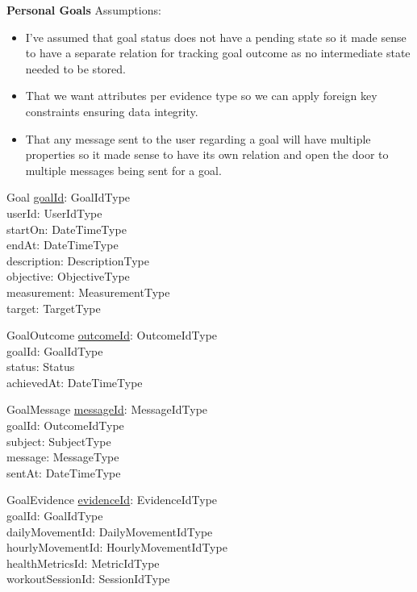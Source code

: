 \documentclass{article}
\begin{document}
\newline
\textbf{Personal Goals}
\newline \newline Assumptions:
\begin{itemize}
  \item I've assumed that goal status does not have a pending state so it made sense to have a separate relation for tracking goal outcome as no intermediate state needed to be stored. 
  \item That we want attributes per evidence type so we can apply foreign key constraints ensuring data integrity.
  \item That any message sent to the user regarding a goal will have multiple properties so it made sense to have its own relation and open the door to multiple messages being sent for a goal.
\end{itemize}
\begin{schema}{Goal}
	\underline{goalId}: GoalIdType \\
  userId: UserIdType \\
  startOn: DateTimeType \\
  endAt: DateTimeType \\ 
  description: DescriptionType \\
  objective: ObjectiveType \\
  measurement: MeasurementType \\
  target: TargetType \\ 
\end{schema}
\vspace{-0.75cm}
\begin{schema}{GoalOutcome}
	\underline{outcomeId}: OutcomeIdType \\
  goalId: GoalIdType \\
  status: Status \\
  achievedAt: DateTimeType \\
\end{schema}
\vspace{-0.75cm}
\begin{schema}{GoalMessage}
	\underline{messageId}: MessageIdType \\
  goalId: OutcomeIdType \\
  subject: SubjectType \\
  message: MessageType \\
  sentAt: DateTimeType \\
\end{schema}
\vspace{-0.75cm}
\begin{schema}{GoalEvidence}
	\underline{evidenceId}: EvidenceIdType \\
  goalId: GoalIdType \\
  dailyMovementId: DailyMovementIdType \\
  hourlyMovementId: HourlyMovementIdType \\
  healthMetricsId: MetricIdType \\
  workoutSessionId: SessionIdType \\
\end{schema}
\end{document}
